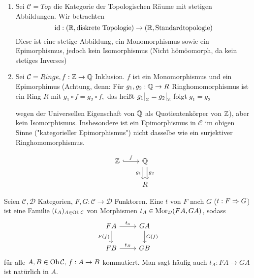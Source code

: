 \begin{bsp}
	\begin{enumerate} [label= \alph*)]
		\item  Sei $\mathcal{C} = Top  $ die Kategorie der Topologischen Räume mit stetigen Abbildungen. Wir betrachten $$\operatorname{id}: (\mathbb{R}, \text{diskrete Topologie}) \to (\mathbb{R}, \text{Standardtopologie})$$ Diese ist eine stetige Abbildung, ein Monomorphismus sowie ein Epimorphismus, jedoch kein Isomorphismus (Nicht hömöomorph, da kein stetiges Inverses)
		\item Sei $\mathcal{C} = Ringe, f:\mathbb{Z} \to \mathbb{Q} $ Inklusion. $f$ ist ein  Monomorphismus und ein Epimorphimus (Achtung, denn: Für $g_1,g_2: \mathbb{Q} \to R$ Ringhomomorphismus ist ein Ring $R$ mit $g_1 \circ f = g_2 \circ f, $ das heißt $ g_1\big|_{\mathbb{Z}} = g_2\big|_{\mathbb{Z}} $ folgt $ g_1 = g_2 $
		 \begin{minipage}[t]{0.7\textwidth}
		 	wegen der Universellen Eigenschaft von $\mathbb{Q}$ als
		 	Quotientenkörper von $\mathbb{Z}$), aber kein Isomorphismus. 
		Insbesondere ist ein Epimorphismus in $\mathcal{C} $ im obigen Sinne  ("kategorieller Epimorphismus") nicht dasselbe wie ein surjektiver Ringhomomorphismus.
		\end{minipage}
		\begin{minipage}[t]{0.3\textwidth} 
			$$\begin{tikzcd}
			\Z \arrow[hook]{r}{f} & \Q \arrow[xshift = 0.7ex]{d}{g_2} \arrow[xshift = -0.7ex, swap]{d}{g_1}\\ & R
			\end{tikzcd}$$
		\end{minipage}
	\end{enumerate}
\end{bsp}
\begin{df}\label{4.14}
	Seien $\mathcal{C}, \mathcal{D}$ Kategorien, $F,G:\mathcal{C} \to \mathcal{D}$ Funktoren. Eine  $t$ von $F$ nach $G$ ($t: F \Rightarrow G$) ist eine Familie $(t_A)_{A\in \text{Ob}\,\mathcal{C}}$ von Morphismen $t_A\in \text{Mor}_{\mathcal{D}}(FA, GA)$, sodass 
	$$\begin{tikzcd}
	FA \arrow{r}{t_a} \arrow[swap]{d}{F(f)}& GA\arrow{d}{G(f)}\\
	FB \arrow{r}{t_B} & GB
	\end{tikzcd}$$
	für alle $A,B \in \text{Ob}\,\mathcal{C}, \, f:A\to B$ kommutiert. Man sagt häufig auch $t_A: FA \to GA$ ist natürlich in $A$.
\end{df}
